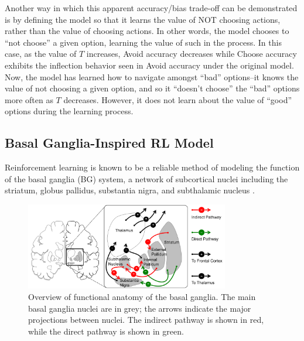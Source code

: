 \documentclass[10pt,letterpaper]{article}
\begin{document}
Another way in which this apparent accuracy/bias trade-off can be demonstrated is by defining the model so that it learns the value of NOT choosing actions, rather than the value of choosing actions. In other words, the model chooses to ``not choose'' a given option, learning the value of such in the process. In this case, as the value of $T$ increases, Avoid accuracy decreases while Choose accuracy exhibits the inflection behavior seen in Avoid accuracy under the original model. Now, the model has learned how to navigate amongst ``bad'' options--it knows the value of not choosing a given option, and so it ``doesn't choose'' the ``bad'' options more often as $T$  decreases. However, it does not learn about the value of ``good'' options during the learning process.

\subsection{Basal Ganglia-Inspired RL Model}

Reinforcement learning is known to be a reliable method of modeling the function of the basal ganglia (BG) system, a network of subcortical nuclei including the striatum, globus pallidus, substantia nigra, and subthalamic nucleus \cite{alexander1990function}.

\begin{figure}[ht]
	\begin{center}
		\includegraphics[width=3.5in]{basal-ganglia.png}
	\end{center}
	\caption{Overview of functional anatomy of the basal ganglia. The main basal ganglia nuclei are in grey; the arrows indicate the major projections between nuclei. The indirect pathway is shown in red, while the direct pathway is shown in green.} 
	\label{bg}
\end{figure}
\end{document}
